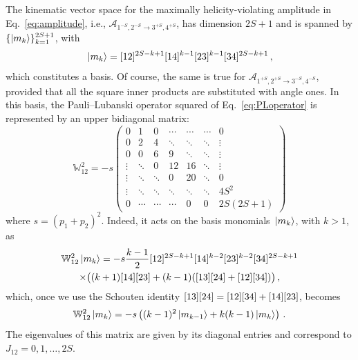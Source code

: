 The kinematic vector space for the maximally helicity-violating amplitude in Eq.~\eqref{eq:amplitude}, i.e., $\mathcal A_{1^{-S},2^{-S}\to 3^{+S},4^{+S}}$, has dimension $2S+1$ and is spanned by $\{\ket{m_k}\}_{k=1}^{2S+1}$, with
%
\begin{equation}
    \ket*{m_k} = \lbrack 1 2 \rbrack^{2S-k+1}\lbrack 1 4 \rbrack^{k-1}\lbrack 2 3 \rbrack^{k-1}\lbrack 3 4 \rbrack^{2S-k+1} \,,
\end{equation}
%
which constitutes a basis.
Of course, the same is true for $\mathcal A_{1^{+S},2^{+S}\to 3^{-S},4^{-S}}$, provided that all the square inner products are substituted with angle ones.
%
In this basis, the Pauli--Lubanski operator squared of Eq.~\eqref{eq:PLoperator} is represented by an upper bidiagonal matrix:
%
\begin{equation}
    \mathbb W^2_{12}=-s 
    \begin{pmatrix}
        0 & 1 & 0 & \cdots & \cdots & \cdots & 0 \\
        0 & 2 & 4 & \ddots & \ddots & \ddots & \vdots \\
        0 & 0 & 6 & 9 & \ddots & \ddots & \vdots \\
        \vdots & \ddots & 0 & 12 & 16 &\ddots & \vdots \\
        \vdots & \ddots & \ddots & 0 & 20 & \ddots & 0 \\
        \vdots & \ddots & \ddots & \ddots & \ddots & \ddots & 4S^2 \\
        0 & \cdots & \cdots & \cdots & 0 & 0 & 2S(2S+1) 
    \end{pmatrix}
\end{equation}
%
where $s=(p_1+p_2)^2$.
Indeed, it acts on the basis monomials $\ket*{m_k}$, with $k>1$, as
%
\begin{multline}
    \mathbb W^2_{12} \ket*{m_k} = -s
    \frac{k-1}{2}\lbrack 1 2 \rbrack^{2S-k+1}\lbrack 1 4 \rbrack^{k-2}\lbrack 2 3 \rbrack^{k-2}\lbrack 3 4 \rbrack^{2S-k+1} \\
     \times 
    \big((k+1)\lbrack 1 4 \rbrack\lbrack 2 3 \rbrack+(k-1)(\lbrack 1 3 \rbrack\lbrack 2 4 \rbrack+\lbrack 1 2 \rbrack\lbrack 3 4 \rbrack)\big)\,,
\end{multline}
%
which, once we use the Schouten identity $\lbrack 1 3 \rbrack\lbrack 2 4 \rbrack=\lbrack 1 2 \rbrack\lbrack 3 4 \rbrack+\lbrack 1 4 \rbrack\lbrack 2 3 \rbrack$, becomes
%
\begin{equation}
   \mathbb W^2_{12} \ket*{m_k} = -s\left((k-1)^2\ket*{m_{k-1}}+k(k-1)\ket*{m_k}\right)\,.
\end{equation}
%
The eigenvalues of this matrix are given by its diagonal entries and correspond to $J_{12}=0,1,\dotsc,2S$. 

